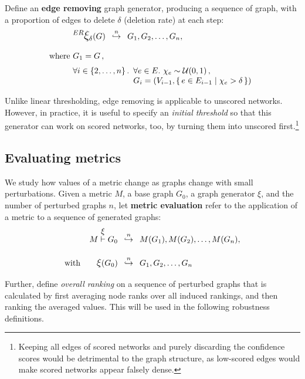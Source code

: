 Define an \textbf{edge removing} graph generator, producing a sequence of graph, with a proportion of edges to delete $\delta$ (deletion rate) at each step:
\begin{align}
    &\mathlarger{^{ER} \mathlarger{\xi}}_\delta(G) \generates{n} G_1, G_2, \dots, G_n, \label{eq:edge_removing_generator}\\[6pt]
    \text{where}~& G_1 = G\,, \nonumber \\
    & \forall i \in \left\{2, \dots, n\right\}. \begin{array}[t]{l}
                                                    \forall e \in E.\ \chi_e\sim\mathcal{U}(0,1)\,, \\ G_i = \left( V_{i-1}, \Set{ e \in E_{i-1} }{ \chi_e > \delta }  \right)
    \end{array} \nonumber \\
\end{align}

Unlike linear thresholding, edge removing is applicable to unscored networks.
However, in practice, it is useful to specify an \textsl{initial threshold} so that this generator can work on scored networks, too, by turning them into unscored first.\footnote{Keeping all edges of scored networks and purely discarding the confidence scores would be detrimental to the graph structure, as low-scored edges would make scored networks appear falsely dense.}

\subsection{Evaluating metrics}\label{sec:evaluating_metrics}

We study how values of a metric change as graphs change with small perturbations.
Given a metric $M$, a base graph $G_0$, a graph generator $\xi$, and the number of perturbed graphs $n$, let \textbf{metric evaluation} refer to the application of a metric to a sequence of generated graphs:
\begin{align}
    M \overset{\mathlarger{\xi}}{\vdash} G_0 &\generates{n} M(G_1), M(G_2), \dots, M(G_n), \\[10pt]
    \text{with}\qquad \mathlarger{\xi}(G_0) &\generates{n} G_1, G_2, \dots, G_n \nonumber
\end{align}

Further, define \textsl{overall ranking} on a sequence of perturbed graphs that is calculated by first averaging node ranks over all induced rankings, and then ranking the averaged values.
This will be used in the following robustness definitions.

